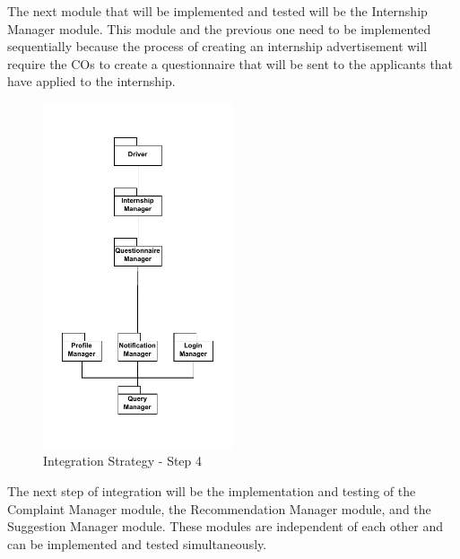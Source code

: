 \par The next module that will be implemented and tested will be the Internship Manager module. This module and the previous
one need to be implemented sequentially because the process of creating an internship advertisement will require the 
COs to create a questionnaire that will be sent to the applicants that have applied to the internship.

\begin{figure}[H]
    \centering
    \includegraphics[width=0.5\textwidth]{Images/Integ_4.pdf}
    \caption{Integration Strategy - Step 4}
    \label{fig:integration-strategy-step-4}
\end{figure}

\par The next step of integration will be the implementation and testing of the Complaint Manager module, the Recommendation
Manager module, and the Suggestion Manager module. These modules are independent of each other and can be implemented and
tested simultaneously.

